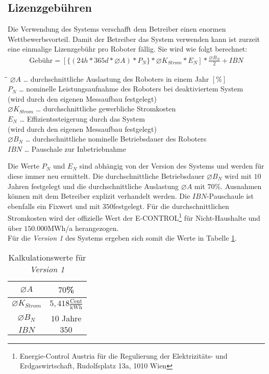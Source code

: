 \subsection{Lizenzgebühren}
Die Verwendung des Systems verschafft dem Betreiber einen enormen Wettbewerbsvorteil. Damit der Betreiber das System verwenden kann ist zurzeit eine einmalige Lizenzgebühr pro Roboter fällig. Sie wird wie folgt berechnet:\\
\begin{align*}
	\text{Gebühr} = [\{(24h * 365d * \varnothing A)*P_N\}*\varnothing K_{Strom}*E_N]*\frac{\varnothing B_N}{2} + IBN
\end{align*}
\begin{tabbing}
	\hspace{1,8cm}\=\hspace{0,6cm}\=\kill
	$\varnothing A$ \> \dots \> durchschnittliche Auslastung des Roboters in einem Jahr $[\%]$\\ 
	$P_N$\> \dots \> nominelle Leistungsaufnahme des Roboters bei deaktiviertem System\\ 
	\> \> (wird durch den eigenen Messaufbau festgelegt)\\
	$\varnothing K_{Strom}$\> \dots \> durchschnittliche gewerbliche Stromkosten\\ 
	$E_N$\> \dots \> Effizientssteigerung durch das System\\ 
	\> \> (wird durch den eigenen Messaufbau festgelegt) \\
	$\varnothing B_N$ \> \dots \> durchschnittliche nominelle Betriebsdauer des Roboters \\
	$IBN$ \> \dots \> Pauschale zur Inbetriebnahme
\end{tabbing}
Die Werte $P_N$ und $E_N$ sind abhängig von der Version des Systems und werden für diese immer neu ermittelt. Die durchschnittliche Betriebsdauer $\varnothing B_N$ wird mit $10$ Jahren festgelegt und die durchschnittliche Auslastung $\varnothing A$ mit $70$\%. Ausnahmen können mit dem Betreiber explizit verhandelt werden. Die $IBN$-Pauschaule ist ebenfalls ein Fixwert und mit $350$\officialeuro festgelegt. Für die durchschnittlichen Stromkosten wird der offizielle Wert der \textsf{E-CONTROL}\footnote{Energie-Control Austria für die Regulierung der Elektrizitäts- und Erdgaswirtschaft, Rudolfsplatz 13a, 1010 Wien} für Nicht-Haushalte und über $150.000$MWh/a herangezogen.\\
Für die \textit{Version 1} des Systems ergeben sich somit die Werte in Tabelle \ref{tab:Kalkulationswerte}.
\begin{table}[h]
	\centering
	\begin{tabular}{|c|c|}
		\hline 
		$\varnothing A$ & $70$\% \\ 
		\hline 
		$\varnothing K_{Strom}$ & $5,418\frac{\text{Cent}}{\text{kWh}}$ \\ 
		\hline
		$\varnothing B_N$ & $10$ Jahre \\ 
		\hline 
		$IBN$ & $350$\officialeuro \\ 
		\hline 
	\end{tabular}
	\caption{Kalkulationswerte für \textit{Version 1}}
	\label{tab:Kalkulationswerte}
\end{table}
